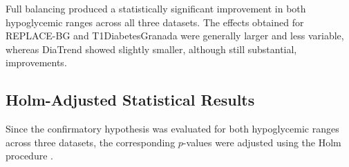 \begin{table}[htbp]
\centering
\caption{Cross-dataset comparison of the primary statistical outcomes.}
\label{tab:cross_dataset_primary_results}
\end{table}

Full balancing produced a statistically significant improvement in both hypoglycemic ranges across all three datasets. The effects obtained for REPLACE-BG and T1DiabetesGranada were generally larger and less variable, whereas DiaTrend showed slightly smaller, although still substantial, improvements.

\subsection{Holm-Adjusted Statistical Results}
\label{subsec:holm_adjusted_results}

Since the confirmatory hypothesis was evaluated for both hypoglycemic ranges across three datasets, the corresponding $p$-values were adjusted using the Holm procedure \cite{enwiki:1352765388}.

